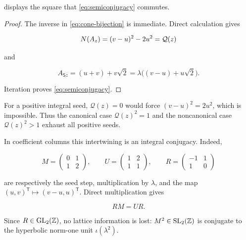  displays the square that
\cref{eq:semiconjugacy} commutes.

\begin{proof}
The inverse in \cref{eq:cone-bijection} is immediate. Direct calculation
gives

\begin{equation}
 N\!\left(A_z\right)=(v-u)^2-2u^2=\mathcal Q(z)
\end{equation}

and

\begin{equation}
 A_{\mathsf Sz}=(u+v)+v\sqrt2
 =\lambda\bigl((v-u)+u\sqrt2\bigr).
\end{equation}

Iteration proves \cref{eq:semiconjugacy}.
\end{proof}

For a positive integral seed, $\mathcal Q(z)=0$ would force
$(v-u)^2=2u^2$, which is impossible. Thus the canonical case
$\mathcal Q(z)^2=1$ and the noncanonical case
$\mathcal Q(z)^2>1$ exhaust all positive seeds.

In coefficient columns this intertwining is an integral conjugacy. Indeed,

\begin{equation}
 M=\begin{pmatrix}0&1\\1&2\end{pmatrix},
 \qquad
 U=\begin{pmatrix}1&2\\1&1\end{pmatrix},
 \qquad
 R=\begin{pmatrix}-1&1\\1&0\end{pmatrix}
 \label{eq:conjugacy-matrices}
\end{equation}

are respectively the seed step, multiplication by $\lambda$, and the map
$(u,v)^{\mathsf T}\mapsto(v-u,u)^{\mathsf T}$. Direct multiplication gives

\begin{equation}
 RM=UR.
 \label{eq:integral-conjugacy}
\end{equation}

Since $R\in\mathrm{GL}_2(\mathbb{Z})$, no lattice information is lost:
$M^2\in\mathrm{SL}_2(\mathbb{Z})$ is conjugate to the hyperbolic norm-one unit
$\iota(\lambda^2)$.

